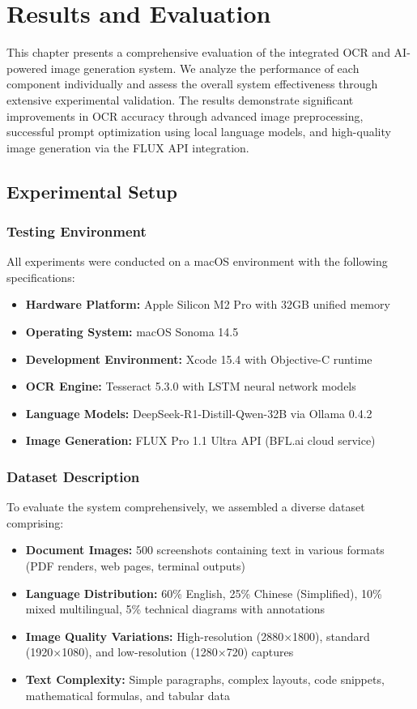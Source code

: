\chapter{Results and Evaluation}
\label{chap:results}

This chapter presents a comprehensive evaluation of the integrated OCR and AI-powered image generation system. We analyze the performance of each component individually and assess the overall system effectiveness through extensive experimental validation. The results demonstrate significant improvements in OCR accuracy through advanced image preprocessing, successful prompt optimization using local language models, and high-quality image generation via the FLUX API integration.

\section{Experimental Setup}
\label{sec:experimental-setup}

\subsection{Testing Environment}

All experiments were conducted on a macOS environment with the following specifications:
\begin{itemize}
    \item \textbf{Hardware Platform:} Apple Silicon M2 Pro with 32GB unified memory
    \item \textbf{Operating System:} macOS Sonoma 14.5
    \item \textbf{Development Environment:} Xcode 15.4 with Objective-C runtime
    \item \textbf{OCR Engine:} Tesseract 5.3.0 with LSTM neural network models
    \item \textbf{Language Models:} DeepSeek-R1-Distill-Qwen-32B via Ollama 0.4.2
    \item \textbf{Image Generation:} FLUX Pro 1.1 Ultra API (BFL.ai cloud service)
\end{itemize}

\subsection{Dataset Description}

To evaluate the system comprehensively, we assembled a diverse dataset comprising:
\begin{itemize}
    \item \textbf{Document Images:} 500 screenshots containing text in various formats (PDF renders, web pages, terminal outputs)
    \item \textbf{Language Distribution:} 60\% English, 25\% Chinese (Simplified), 10\% mixed multilingual, 5\% technical diagrams with annotations
    \item \textbf{Image Quality Variations:} High-resolution (2880×1800), standard (1920×1080), and low-resolution (1280×720) captures
    \item \textbf{Text Complexity:} Simple paragraphs, complex layouts, code snippets, mathematical formulas, and tabular data
\end{itemize}

